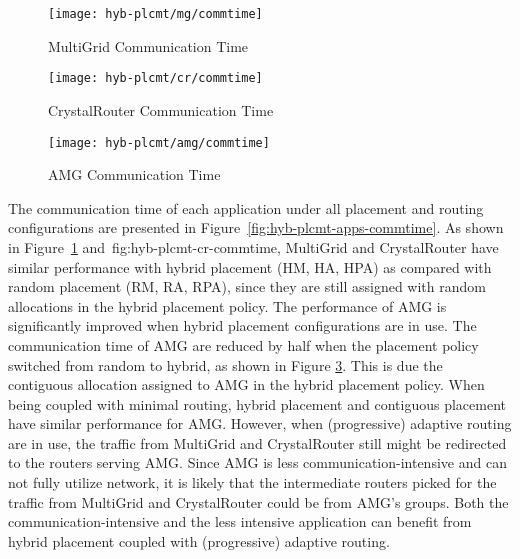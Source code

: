 \begin{figure*}[t!]
    \centering
    \begin{subfigure}[t]{0.32\textwidth}
        \centering
        \texttt{[image: hyb-plcmt/mg/commtime]}
        \caption{MultiGrid Communication Time}
        \label{fig:hyb-plcmt-mg-commtime}
    \end{subfigure}\hfill
    \begin{subfigure}[t]{0.32\textwidth}
        \centering
        \texttt{[image: hyb-plcmt/cr/commtime]}
        \caption{CrystalRouter Communication Time}
        \label{fig:hyb-plcmt-cr-commtime}
    \end{subfigure}\hfill
    \begin{subfigure}[t]{0.32\textwidth}
        \centering
        \texttt{[image: hyb-plcmt/amg/commtime]}
        \caption{AMG Communication Time}
        \label{fig:hyb-plcmt-amg-commtime}
    \end{subfigure}
   \caption{Application communication time. Workload~ is running with all placement and routing configurations.}
   \label{fig:hyb-plcmt-apps-commtime}
\end{figure*}

The communication time of each application under all placement and routing configurations are presented in Figure~\ref{fig:hyb-plcmt-apps-commtime}. 
As shown in Figure~\ref{fig:hyb-plcmt-mg-commtime} and~{fig:hyb-plcmt-cr-commtime},
MultiGrid and CrystalRouter have similar performance with hybrid placement (HM, HA, HPA) as compared with random placement (RM, RA, RPA),
since they are still assigned with random allocations in the hybrid placement policy. 
The performance of AMG is significantly improved when hybrid placement configurations are in use. 
The communication time of AMG are reduced by half when the placement policy switched from random to hybrid, 
as shown in Figure \ref{fig:hyb-plcmt-amg-commtime}. 
This is due the contiguous allocation assigned to AMG in the hybrid placement policy. 
When being coupled with minimal routing, hybrid placement and contiguous placement have similar performance for AMG. 
However, when (progressive) adaptive routing are in use, the traffic from MultiGrid and CrystalRouter still might be redirected to the routers serving AMG. 
Since AMG is less communication-intensive and can not fully utilize network, 
it is likely that the intermediate routers picked for the traffic from MultiGrid and CrystalRouter could be from AMG's groups. Both the communication-intensive and the less intensive application can benefit from hybrid placement coupled with (progressive) adaptive routing.


